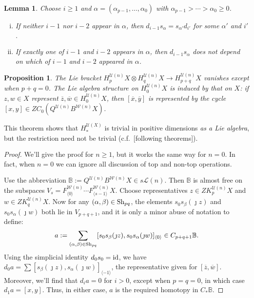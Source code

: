 \documentclass[11pt]{amsart}
\theoremstyle{plain}
\newtheorem{lem}[thm]{Lemma}
\newtheorem{prop}[thm]{Proposition}
\theoremstyle{definition}
\renewcommand{\to}{\longrightarrow}
\newcommand{\squishlist}{
  \setlength{\itemsep}{.5pt}
  \setlength{\parskip}{0pt}
  \setlength{\parsep}{0pt}}
\newcommand{\calW}{\mathcal{W}}
\newcommand{\calU}{\mathcal{U}}
\newcommand{\calL}{\mathcal{L}}
\theoremstyle{plain}
\newcommand{\Shuffles}[2]{\textup{Sh}_{#1#2}}
\newcommand{\Id}{\textup{id}}
\begin{document}
\begin{Koszul complexes}
\begin{lem}\label{LemmaOnSimplicialRelations}
Choose $i\geq1$ and $\alpha=(\alpha_{p-1},\ldots,\alpha_0)$ with $\alpha_{p-1}>\cdots >\alpha_0\geq0$.
\begin{enumerate}[i)]\squishlist
\setlength{\parindent}{.25in}
\item[i)] If neither $i-1$ nor $i-2$ appear in $\alpha$, then  $d_{i-1}s_\alpha=s_{\alpha'}d_{i'}$ for some $\alpha'$ and $i'$.
\item[ii)] If exactly one of $i-1$ and $i-2$ appears in $\alpha$, then  $d_{i-1}s_\alpha$ does not depend on which of $i-1$ and $i-2$ appeared in $\alpha$.
\end{enumerate}
\end{lem}

\begin{prop}\label{LieBracketsTrivial}
The Lie bracket $H_p^{\calU(n)}X\otimes H_q^{\calU(n)}X\to H_{p+q}^{\calU(n)}X$ vanishes except when $p+q=0$. 
The Lie algebra structure on $H_0^{\calU(n)}X$ is induced by that on $X$: if $z,w\in X$ represent $\overline{z},\overline{w}\in H_0^{\calU(n)}X$, then $[\overline{x},\overline{y}]$ is represented by the cycle $[x,y]\in ZC_0(Q^{\calU(n)}B^{\calW(n)}X)$.
\end{prop}
\noindent This theorem shows that $H_*^{\calU(X)}$ is trivial in positive dimensions \emph{as a Lie algebra}, but the restriction need not be trivial (c.f.\ [following theorems]).
\begin{proof}
We'll give the proof for $n\geq1$, but it works the same way for $n=0$. In fact, when $n=0$ we can ignore all discussion of top and non-top operations.

Use the abbreviation $\mathbb{B}:=Q^{\calU(n)}B^{\calW(n)}X\in s\calL(n)$. Then $\mathbb{B}$ is almost free on the subspaces $V_s=F^{\calW(n)}_{\langle 0\rangle}\cdots F^{\calW(n)}_{\langle s-1\rangle}X$. Choose representatives $z\in ZK_p^{\calU(n)}X$ and $w\in ZK_q^{\calU(n)}X$. Now  for any $(\alpha,\beta)\in\Shuffles{p}{q}$, the elements $s_{0}s_\beta(\jmath z)$ and $s_{0}s_\alpha(\jmath w)$ both lie in $V_{p+q+1}$, and it is only a minor abuse of notation to define:
\[a:=\sum_{(\alpha,\beta)\in\Shuffles{p}{q}}[s_{0}s_\beta(\jmath z), s_{0}s_\alpha(\jmath w)]_{\langle 0\rangle}\in C_{p+q+1}\mathbb{B}.\]
Using the simplicial identity $d_0s_0=\Id$, we have $d_{0}a=\sum [s_\beta(\jmath z), s_\alpha(\jmath w)]_{\langle -1\rangle}$, the representative given for $[\overline{z},\overline{w}]$. Moreover, we'll find that $d_ia=0$ for $i>0$, except when $p=q=0$, in which case $d_1a=[x,y]$. Thus, in either case, $a$ is the required homotopy in $C_*\mathbb{B}$.


\end{proof}
\end{Koszul complexes}
\end{document}
